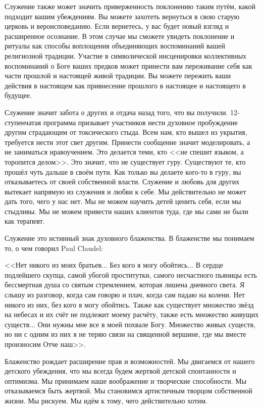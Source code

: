 \documentclass[10pt, fleqn]{article}
\begin{document}
Служение также может значить приверженность поклонению таким путём, какой подходит вашим убеждениям. Вы можете захотеть вернуться в свою старую церковь и вероисповеданию. Если вернетесь, у вас будет новый взгляд и расширенное осознание. В этом случае мы сможете увидеть поклонение и ритуалы как способы воплощения объединяющих воспоминаний вашей религиозной традиции. Участие в символической инсценировки коллективных воспоминаний о Боге ваших предков может принести вам переживание себя как части прошлой и настоящей живой традиции. Вы можете пережить ваши действия в настоящем как привнесение прошлого в настоящее и настоящего в будущее.

Служение значит забота о других и отдача назад того, что вы получили. 12-ступенчатая программа призывает участников нести духовное пробуждение другим страдающим от токсического стыда. Всем нам, кто вышел из укрытия, требуется нести этот свет другим. Принести сообщение значит моделировать, а не заниматься нравоучением. Это делается теми, кто <<не спешит языком, а торопится делом>>. Это значит, что не существует гуру. Существуют те, кто прошёл чуть дальше в своём пути. Как только вы делаете кого-то в гуру, вы отказываетесь от своей собственной власти. Служение и любовь для других вытекает напрямую из служения и любви к себе. Мы действительно не может дать того, чего у нас нет. Мы не можем научить детей ценить себя, если мы стыдливы. Мы не можем привести наших клиентов туда, где мы сами не были как терапевт.

Служение это истинный знак духовного блаженства. В блаженстве мы понимаем то, о чем говорил Paul Claudel:

<<Нет никого из моих братьев... Без кого я могу обойтись... В сердце подлейшего скупца, самой убогой проститутки, самого несчастного пьяницы есть бессмертная душа со святым стремлением, которая лишена дневного света. Я слышу из разговор, когда сам говорю и плач, когда сам падаю на колени. Нет никого из них, без кого я могу обойтись. Также как существует множество звёзд на небесах и их счёт не подлежит моему расчёту, также есть множество живущих существ... Они нужны мне все в моей похвале Богу. Множество живых существ, но ни с одним из них я не теряю связи на священной вершине, где мы вместе произносим Отче наш>>.


Блаженство рождает расширение прав и возможностей. Мы двигаемся от нашего детского убеждения, что мы всегда будем жертвой детской спонтанности и оптимизма. Мы принимаем наше воображение и творческие способности. Мы отказываемся быть жертвой. Мы становимся артистичным творцом собственной жизни. Мы рискуем. Мы идём к тому, чего действительно хотим.
\end{document}
